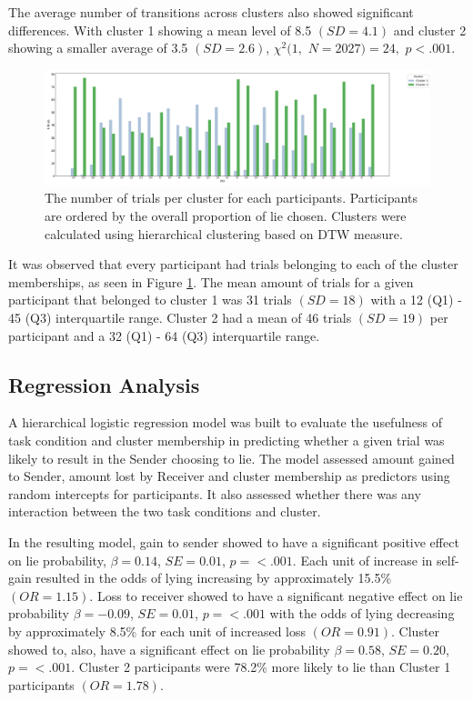 \documentclass[man, floatsintext]{apa7}
\begin{document}
The average number of transitions across clusters also showed significant differences. With cluster 1 showing a mean level of 8.5 $(SD = 4.1)$ and cluster 2 showing a smaller average of 3.5 $(SD = 2.6)$, $\chi^2(1,$ $N=2027) = 24,$ $p<.001$.

\begin{figure}[H]
	\centering
	\includegraphics[width=\linewidth]{../plots/ALLTRIAL/NTrialsByPID.png}
	\caption{The number of trials per cluster for each participants. Participants are ordered by the overall proportion of lie chosen. Clusters were calculated using hierarchical clustering based on DTW measure.}
	\label{fig:NTrialsByPIDPerCluster}
\end{figure}


It was observed that every participant had trials belonging to each of the cluster memberships, as seen in Figure \ref{fig:NTrialsByPIDPerCluster}. The mean amount of trials for a given participant that belonged to cluster 1 was 31 trials $(SD = 18)$ with a 12 (Q1) - 45 (Q3) interquartile range. Cluster 2 had a mean of 46 trials $(SD = 19)$ per participant and a 32 (Q1) - 64 (Q3) interquartile range. 

\subsection{Regression Analysis}

A hierarchical logistic regression model was built to evaluate the usefulness of task condition and cluster membership in predicting whether a given trial was likely to result in the Sender choosing to lie. The model assessed amount gained to Sender, amount lost by Receiver and cluster membership as predictors using random intercepts for participants. It also assessed whether there was any interaction between the two task conditions and cluster.

In the resulting model, gain to sender showed to have a significant positive effect on lie probability, $\beta = 0.14$, $SE = 0.01$, $p = < .001$. Each unit of increase in self-gain resulted in the odds of lying increasing by approximately 15.5\% $(OR=1.15)$. Loss to receiver showed to have a significant negative effect on lie probability $\beta = -0.09$, $SE = 0.01$, $p = < .001$ with the odds of lying decreasing by approximately 8.5\% for each unit of increased loss $(OR=0.91)$. Cluster showed to, also, have a significant effect on lie probability $\beta = 0.58$, $SE = 0.20$, $p = < .001$. Cluster 2 participants were 78.2\% more likely to lie than Cluster 1 participants $(OR=1.78)$.
\end{document}
